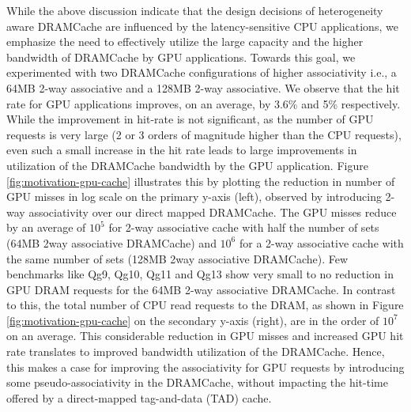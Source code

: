 
While the above discussion indicate that the design decisions of heterogeneity aware DRAMCache are influenced by the latency-sensitive CPU applications, we emphasize the need to effectively utilize the large capacity and the higher bandwidth of DRAMCache by GPU applications. Towards this goal, we experimented with two DRAMCache configurations of higher associativity i.e., a 64MB 2-way associative and a 128MB 2-way associative. We observe that the hit rate for GPU applications improves, on an average, by 3.6\% and 5\% respectively. While the improvement in hit-rate is not significant, as the number of GPU requests is very large (2 or 3 orders of magnitude higher than the CPU requests), even such a small increase in the hit rate leads to large improvements in utilization of the DRAMCache bandwidth by the GPU application. Figure \ref{fig:motivation-gpu-cache} illustrates this by plotting the reduction in number of GPU misses in log scale on the primary y-axis (left), observed by introducing 2-way associativity over our direct mapped DRAMCache. The GPU misses reduce by an average of $10^5$ for 2-way associative cache with half the number of sets (64MB 2way associative DRAMCache) and $10^6$ for a 2-way associative cache with the same number of sets (128MB 2way associative DRAMCache). Few benchmarks like Qg9, Qg10, Qg11 and Qg13 show very small to no reduction in GPU DRAM requests for the 64MB 2-way associative DRAMCache. 
In contrast to this, the total number of CPU read requests to the DRAM, as shown in Figure \ref{fig:motivation-gpu-cache} on the secondary y-axis (right), are in the order of $10^7$ on an average. This considerable reduction in GPU misses and increased GPU hit rate translates to improved bandwidth utilization of the DRAMCache. Hence, this makes a case for improving the associativity for GPU requests by introducing some pseudo-associativity in the DRAMCache, without impacting the hit-time offered by a direct-mapped tag-and-data (TAD) cache.


